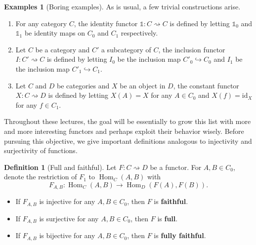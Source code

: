 \documentclass{article}
\theoremstyle{definition}
\newtheorem{defn}[thm]{Definition}
\newtheorem{exmps}[thm]{Examples}
\theoremstyle{remark}
\newcommand{\one}{\mathbb{1}}
\DeclareMathOperator{\Hom}{Hom}
\newcommand{\id}{\text{id}}
\begin{document}
\begin{exmps}[Boring examples]
	As is usual, a few trivial constructions arise.
	\begin{enumerate}
		\item For any category $C$, the identity functor $\one: C\rightsquigarrow C$ is defined by letting $\one_0$ and $\one_1$ be identity maps on $C_0$ and $C_1$ respectively.
		\item Let $C$ be a category and $C'$ a subcategory of $C$, the inclusion functor $I: C' \rightsquigarrow C$ is defined by letting $I_0$ be the inclusion map $C'_0 \hookrightarrow C_0$ and $I_1$ be the inclusion map $C'_1 \hookrightarrow C_1$.
		\item Let $C$ and $D$ be categories and $X$ be an object in $D$, the constant functor $X: C \rightsquigarrow D$ is defined by letting $X(A) = X$ for any $A \in C_0$ and $X(f) = \id_X$ for any $f \in C_1$.
	\end{enumerate}
\end{exmps}
Throughout these lectures, the goal will be essentially to grow this list with more and more interesting functors and perhaps exploit their behavior wisely. Before pursuing this objective, we give important definitions analogous to injectivity and surjectivity of functions.
\begin{defn}[Full and faithful]
	Let $F:C \rightsquigarrow D$ be a functor. For $A,B \in C_0$, denote the restriction of $F_1$ to $\Hom_C(A,B)$ with \[F_{A,B}:\Hom_C(A,B) \rightarrow \Hom_D(F(A), F(B)).\]
	\begin{itemize}
		\item If $F_{A,B}$ is injective for any $A,B \in C_0$, then $F$ is \textbf{faithful}.
		\item If $F_{A,B}$ is surjective for any $A,B \in C_0$, then $F$ is \textbf{full}.
		\item If $F_{A,B}$ is bijective for any $A,B \in C_0$, then $F$ is \textbf{fully faithful}.
	\end{itemize}    
\end{defn}
\end{document}

